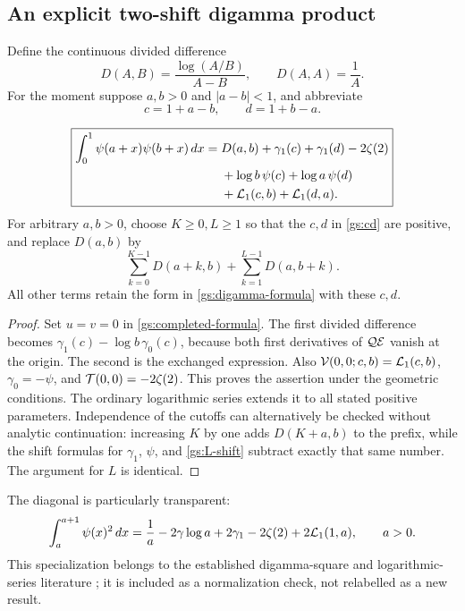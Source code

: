 \subsection{An explicit two-shift digamma product}

Define the continuous divided difference
\[
 D(A,B)=\frac{\log(A/B)}{A-B},\qquad D(A,A)=\frac1A.
\]
For the moment suppose $a,b>0$ and $|a-b|<1$, and abbreviate
\[
 c=1+a-b,\qquad d=1+b-a.
\]

\begin{theorem}
\label{gs:digamma}
\begin{align}
 \boxed{\begin{aligned}
 \int_0^1\psi(a+x)\psi(b+x)\,dx
 ={}&D(a,b)+\gamma_1(c)+\gamma_1(d)-2\zeta(2)\\
 &+\log b\,\psi(c)+\log a\,\psi(d)\\
 &+\mathcal L_1(c,b)+\mathcal L_1(d,a).
 \end{aligned}}
 \label{gs:digamma-formula}
\end{align}
For arbitrary $a,b>0$, choose $K\ge0,L\ge1$ so that the $c,d$ in
\eqref{gs:cd} are positive, and replace $D(a,b)$ by
\[
 \sum_{k=0}^{K-1}D(a+k,b)+\sum_{k=1}^{L-1}D(a,b+k).
\]
All other terms retain the form in \eqref{gs:digamma-formula} with
these $c,d$.
\end{theorem}

\begin{proof}
Set $u=v=0$ in \eqref{gs:completed-formula}.
The first divided difference becomes
$\gamma_1(c)-\log b\,\gamma_0(c)$, because both first derivatives
of $\mathcal Q\mathcal E$ vanish at the origin.  The second is the exchanged
expression.  Also $\mathcal V(0,0;c,b)=\mathcal L_1(c,b)$,
$\gamma_0=-\psi$, and $\mathcal T(0,0)=-2\zeta(2)$.
This proves the assertion under the geometric conditions.
The ordinary logarithmic series extends it to all stated positive
parameters.  Independence of the cutoffs can alternatively be checked
without analytic continuation: increasing $K$ by one adds
$D(K+a,b)$ to the prefix, while the shift formulas for $\gamma_1$,
$\psi$, and \eqref{gs:L-shift} subtract exactly that same number.
The argument for $L$ is identical.
\end{proof}

The diagonal is particularly transparent:
\begin{equation}\label{gs:diagonal-digamma}
 \int_a^{a+1}\psi(x)^2\,dx
 =\frac1a-2\gamma\log a+2\gamma_1-2\zeta(2)
                         +2\mathcal L_1(1,a),\qquad a>0.
\end{equation}
This specialization belongs to the established digamma-square and
logarithmic-series literature \cite{Connon}; it is included as a
normalization check, not relabelled as a new result.

